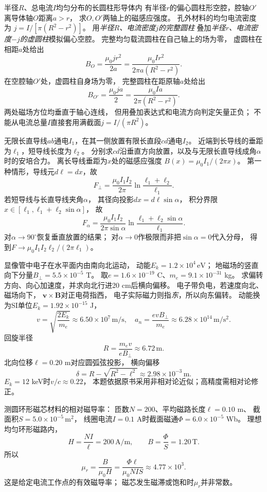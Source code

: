 \problemtext 半径$R$、总电流$I$均匀分布的长圆柱形导体内
有半径$r$的偏心圆柱形空腔，腔轴$O'$离导体轴$O$距离$a>r$，
求$O,O'$两轴上的磁感应强度。
\workings
孔外材料的均匀电流密度为
$j=I/[\pi(R^2-r^2)]$。
用\emph{半径$R$、电流密度$j$的完整圆柱}
叠加\emph{半径$r$、电流密度$-j$的虚圆柱}模拟偏心空腔。
完整均匀载流圆柱在自己轴上的场为零，
虚圆柱在相距$a$处给出
\[
\boxed{B_O=\frac{\mu_0 j r^2}{2a}
=\frac{\mu_0 I r^2}{2\pi a(R^2-r^2)}}.
\]
在空腔轴$O'$处，虚圆柱自身场为零，
完整圆柱在距原轴$a$处给出
\[
\boxed{B_{O'}=\frac{\mu_0ja}{2}
=\frac{\mu_0Ia}{2\pi(R^2-r^2)}}.
\]
\crosscheck 两处磁场方位均垂直于轴心连线，
但用叠加表达式和电流方向判定矢量正负；
不能从电流总量$I$直接套用满截面$j=I/(\pi R^2)$。

\problemtext 无限长直导线$ab$通电$I_1$，在其一侧放置有限长直段$cd$通电$I_2$。
近端到长导线的垂距为$\ell_1$，短导线长度为$\ell_2$。
分别求$cd$沿垂直方向放置，以及与无限长直导线成角$\alpha$时的安培合力。
\workings
离长导线垂距为$x$处的磁感应强度
$B(x)=\mu_0I_1/(2\pi x)$。
第一种情形，导线元$d\ell=dx$，故
\[
\boxed{F_\perp=\frac{\mu_0 I_1I_2}{2\pi}
\ln\frac{\ell_1+\ell_2}{\ell_1}}.
\]
若短导线与长直导线夹角$\alpha$，
其径向投影$dx=d\ell\sin\alpha$，
积分界限$x\in[\ell_1,\ell_1+\ell_2\sin\alpha]$，
故
\[
\boxed{F_\alpha=
\frac{\mu_0I_1I_2}{2\pi\sin\alpha}
\ln\frac{\ell_1+\ell_2\sin\alpha}{\ell_1}}.
\]
\crosscheck 对$\alpha\to90^\circ$恢复垂直放置的结果；
对$\alpha\to0$作极限而非把$\sin\alpha=0$代入分母，
得到$F\to\mu_0I_1I_2\ell_2/(2\pi\ell_1)$。

\problemtext 显像管中电子在水平面内由南向北运动，
动能$E_k=1.2\times10^4\,\mathrm{eV}$；
地磁场的竖直向下分量$B_\perp=5.5\times10^{-5}$ T。
取$e=1.6\times10^{-19}$ C、$m_e=9.1\times10^{-31}$ kg。
求偏转方向、向心加速度，并求向北行进20 cm后横向偏移。
\workings
电子带负电，若速度向北、磁场向下，
$\bm v\times\bm B$对正电荷指西，
电子实际磁力则指\emph{东}，所以向东偏转。
动能换为SI单位$E_k=1.92\times10^{-15}$ J，
\[
v=\sqrt{\frac{2E_k}{m_e}}\approx6.50\times10^7\,\mathrm{m/s},
\quad
\boxed{a_n=\frac{evB_\perp}{m_e}\approx6.28\times10^{14}\,\mathrm{m/s^2}}.
\]
回旋半径
\[
R=\frac{m_ev}{eB_\perp}\approx6.72\,\mathrm m.
\]
北向位移$\ell=0.20$ m对应圆弧弦投影，
横向偏移
\[
\boxed{\delta=R-\sqrt{R^2-\ell^2}
\approx2.98\times10^{-3}\,\mathrm m}.
\]
\crosscheck $E_k=12$ keV时$v/c\approx0.22$，
本题依据原书采用非相对论近似；高精度需相对论修正。

\problemtext 测圆环形磁芯材料的相对磁导率：
匝数$N=200$、平均磁路长度$\ell=0.10$ m、
截面积$S=5.0\times10^{-5}\,\mathrm{m^2}$，
线圈电流$I=0.1$ A时截面磁通$\Phi=6.0\times10^{-5}$ Wb。
\workings
理想均匀环形磁路内，
\[
H=\frac{NI}{\ell}=200\,\mathrm{A/m},\qquad
B=\frac{\Phi}{S}=1.20\,\mathrm T.
\]
所以
\[
\boxed{\mu_r=\frac{B}{\mu_0H}
=\frac{\Phi\ell}{\mu_0NIS}
\approx4.77\times10^3}.
\]
\crosscheck 这是给定电流工作点的有效磁导率；
磁芯发生磁滞或饱和时$\mu_r$并非常数。

